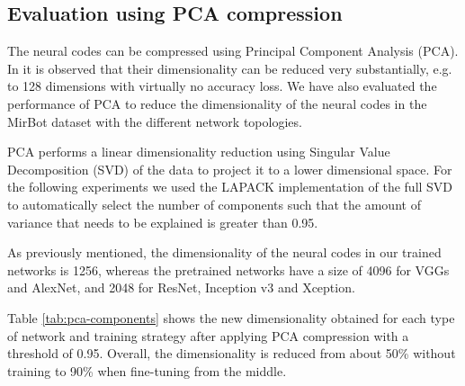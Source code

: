 \documentclass[final, twocolumn]{elsarticle}
\begin{document}
\subsection{Evaluation using PCA compression}
\label{sec:pca}

The neural codes can be compressed using Principal Component Analysis (PCA). In \cite{BabenkoSCL14} it is observed that their dimensionality can be reduced very substantially, e.g. to 128 dimensions with virtually no accuracy loss. We have also evaluated the performance of PCA to reduce the dimensionality of the neural codes in the MirBot dataset with the different network topologies.


PCA performs a linear dimensionality reduction using Singular Value Decomposition (SVD) of the data to project it to a lower dimensional space. For the following experiments we used the LAPACK implementation of the full SVD to automatically select the number of components such that the amount of variance that needs to be explained is greater than 0.95.


 
As previously mentioned, the dimensionality of the neural codes in our trained networks is 1256, whereas the pretrained networks have a size of 4096 for VGGs and AlexNet, and 2048 for ResNet, Inception v3 and Xception. 

Table \ref{tab:pca-components} shows the new dimensionality obtained for each type of network and training strategy after applying PCA compression with a threshold of 0.95. 
Overall, the dimensionality is reduced from about  50\% without training to 90\% when fine-tuning from the middle.
%
\end{document}
